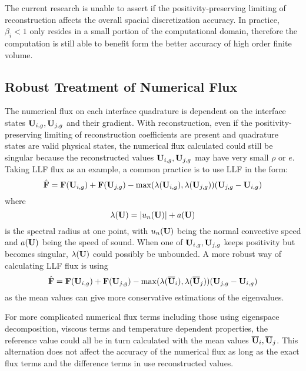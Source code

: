 The current research is unable to assert if the positivity-preserving
limiting of reconstruction affects the overall spacial discretization accuracy.
In practice, $\beta_i < 1$ only resides in a small portion of 
the computational domain, therefore the computation is still able to benefit
form the better accuracy of high order finite volume.

\subsection{Robust Treatment of Numerical Flux}

The numerical flux on each interface 
quadrature is dependent on the interface 
states $\mathbf{U}_{i,g},\mathbf{U}_{j,g}$ and their gradient.
With reconstruction, even if the positivity-preserving
limiting of reconstruction coefficients are present and 
quadrature states are valid physical states, the 
numerical flux calculated could still be singular
because the reconstructed values $\mathbf{U}_{i,g},\mathbf{U}_{j,g}$
may have very small $\rho$ or $e$. 
Taking LLF flux as an example, a common practice is to use LLF in the form:
\begin{equation}
    \label{eq:LLFCommon}
    \hat{\mathbf{F}} = \mathbf{F}(\mathbf{U}_{i,g}) + \mathbf{F}(\mathbf{U}_{j,g}) - \max(\lambda(\mathbf{U}_{i,g}),\lambda(\mathbf{U}_{j,g}))(\mathbf{U}_{j,g}- \mathbf{U}_{i,g})
\end{equation}
where
\begin{equation}
    \lambda(\mathbf{U}) = |u_n(\mathbf{U})| + a(\mathbf{U})
\end{equation}
is the spectral radius at one point, with $u_n(\mathbf{U})$ being the normal convective speed 
and $a(\mathbf{U})$ being the speed of sound.
When one of $\mathbf{U}_{i,g},\mathbf{U}_{j,g}$ keeps positivity but becomes singular,
$\lambda(\mathbf{U})$ could possibly be unbounded.
A more robust way of calculating LLF flux is using 
\begin{equation}
    \hat{\mathbf{F}} = \mathbf{F}(\mathbf{U}_{i,g}) + \mathbf{F}(\mathbf{U}_{j,g}) - \max(\lambda(\overline{\mathbf{U}}_i),\lambda(\overline{\mathbf{U}}_j))(\mathbf{U}_{j,g}- \mathbf{U}_{i,g})
\end{equation}
as the mean values can give more conservative estimations of 
the eigenvalues.

For more complicated numerical flux terms including those 
using eigenspace decomposition, viscous terms 
and temperature dependent properties, 
the reference value could all be in turn calculated with the mean values $\overline{\mathbf{U}}_i, \overline{\mathbf{U}}_j$.
This alternation does not affect the accuracy of the numerical flux 
as long as the exact flux terms and the difference terms in  use 
reconstructed values.


